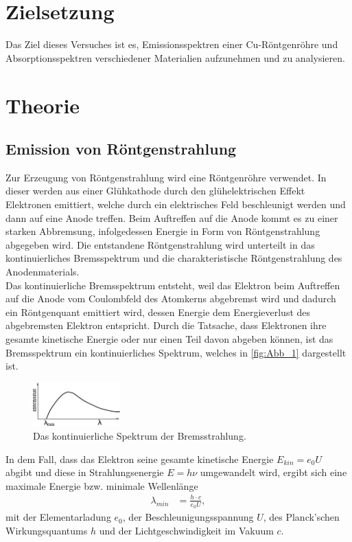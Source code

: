 \section{Zielsetzung}
\label{sec:Zielsetzung}
Das Ziel dieses Versuches ist es, Emissionsspektren einer Cu-Röntgenröhre und Absorptionsspektren verschiedener Materialien
aufzunehmen und zu analysieren.

\section{Theorie}
\label{sec:Theorie}

\subsection{Emission von Röntgenstrahlung} %
\label{sub:Emission}
Zur Erzeugung von Röntgenstrahlung wird eine Röntgenröhre verwendet.
In dieser werden aus einer Glühkathode durch den glühelektrischen Effekt Elektronen emittiert, welche durch ein elektrisches Feld beschleunigt
werden und dann auf eine Anode treffen. Beim Auftreffen auf die Anode kommt es zu einer starken Abbremsung, infolgedessen
Energie in Form von Röntgenstrahlung abgegeben wird.
Die entstandene Röntgenstrahlung wird unterteilt in das kontinuierliches Bremsspektrum und die charakteristische Röntgenstrahlung 
des Anodenmaterials.\\ 
Das kontinuierliche Bremsspektrum entsteht, weil das Elektron beim Auftreffen auf die Anode vom Coulombfeld des Atomkerns abgebremst
wird und dadurch ein Röntgenquant emittiert wird, dessen Energie dem Energieverlust des abgebremsten Elektron entspricht.
Durch die Tatsache, dass Elektronen ihre gesamte kinetische Energie oder nur einen Teil davon abgeben können, ist das Bremsspektrum
ein kontinuierliches Spektrum, welches in \autoref{fig:Abb_1} dargestellt ist.
\begin{figure}[H]
    \centering
    \includegraphics[width=0.3\textwidth]{build/Abb_1.pdf}
    \caption{Das kontinuierliche Spektrum der Bremsstrahlung.\cite{V602}}
    \label{fig:Abb_1}
\end{figure}
In dem Fall, dass das Elektron seine gesamte kinetische Energie $E_{kin}= e_0 U$ abgibt und diese in Strahlungsenergie $E = h \nu$ umgewandelt wird, ergibt
sich eine maximale Energie bzw. minimale Wellenlänge
\begin{align}
    \lambda_{min} &= \frac{h\cdot c}{e_0 U}, \label{eqn:lambdamin}
\end{align}
mit der Elementarladung $e_0$, der Beschleunigungsspannung $U$, des Planck'schen Wirkungsquantums $h$ und der Lichtgeschwindigkeit
im Vakuum $c$.\\

